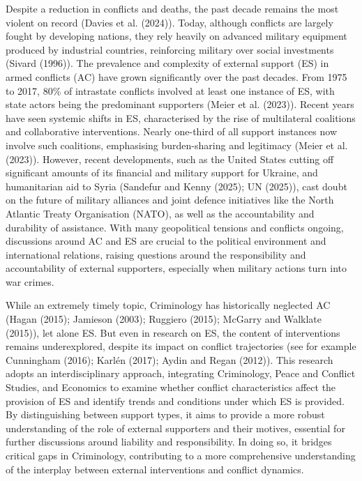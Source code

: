 \documentclass[
]{article}
\begin{document}
Despite a reduction in conflicts and deaths, the past decade remains the
most violent on record (Davies et al. (2024)). Today, although conflicts
are largely fought by developing nations, they rely heavily on advanced
military equipment produced by industrial countries, reinforcing
military over social investments (Sivard (1996)). The prevalence and
complexity of external support (ES) in armed conflicts (AC) have grown
significantly over the past decades. From 1975 to 2017, 80\% of
intrastate conflicts involved at least one instance of ES, with state
actors being the predominant supporters (Meier et al. (2023)). Recent
years have seen systemic shifts in ES, characterised by the rise of
multilateral coalitions and collaborative interventions. Nearly
one-third of all support instances now involve such coalitions,
emphasising burden-sharing and legitimacy (Meier et al. (2023)).
However, recent developments, such as the United States cutting off
significant amounts of its financial and military support for Ukraine,
and humanitarian aid to Syria (Sandefur and Kenny (2025); UN (2025)),
cast doubt on the future of military alliances and joint defence
initiatives like the North Atlantic Treaty Organisation (NATO), as well
as the accountability and durability of assistance. With many
geopolitical tensions and conflicts ongoing, discussions around AC and
ES are crucial to the political environment and international relations,
raising questions around the responsibility and accountability of
external supporters, especially when military actions turn into war
crimes.

While an extremely timely topic, Criminology has historically neglected
AC (Hagan (2015); Jamieson (2003); Ruggiero (2015); McGarry and Walklate
(2015)), let alone ES. But even in research on ES, the content of
interventions remains underexplored, despite its impact on conflict
trajectories (see for example Cunningham (2016); Karlén (2017); Aydin
and Regan (2012)). This research adopts an interdisciplinary approach,
integrating Criminology, Peace and Conflict Studies, and Economics to
examine whether conflict characteristics affect the provision of ES and
identify trends and conditions under which ES is provided. By
distinguishing between support types, it aims to provide a more robust
understanding of the role of external supporters and their motives,
essential for further discussions around liability and responsibility.
In doing so, it bridges critical gaps in Criminology, contributing to a
more comprehensive understanding of the interplay between external
interventions and conflict dynamics.
\end{document}
